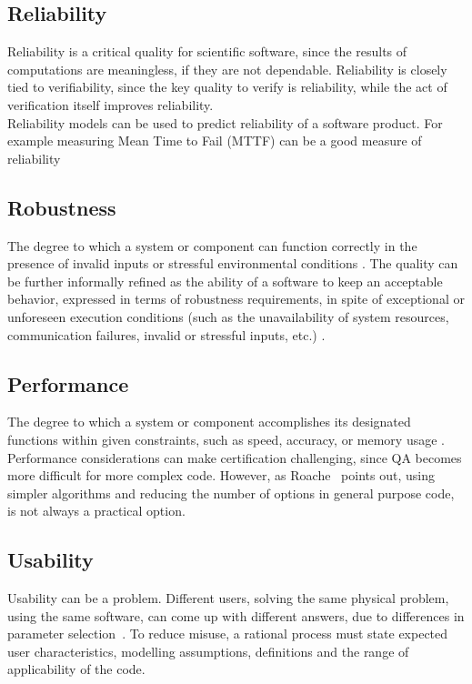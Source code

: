 \documentclass[12pt]{article}
\begin{document}
\subsection{Reliability}

Reliability is a critical quality for scientific software, since the results of
computations are meaningless, if they are not dependable.  Reliability is
closely tied to verifiability, since the key quality to verify is reliability,
while the act of verification itself improves reliability.\\
Reliability models can be used to predict reliability of a software product. For example measuring Mean Time to Fail (MTTF) can be a good measure of reliability \cite{berander2005software}

\subsection{Robustness}
The degree to which a system or component can function correctly in the presence of invalid inputs or stressful environmental conditions \cite{IEEEStdGlossarySET1990}.
The quality can be further informally refined as the ability of a software to keep an acceptable behavior, expressed in terms of robustness requirements, in spite of exceptional or unforeseen execution conditions (such as the unavailability of system resources, communication failures, invalid or stressful inputs, etc.) \cite{fernandez2005model}.

\subsection{Performance}

The degree to which a system or component accomplishes its designated functions within given constraints, such as speed, accuracy, or memory usage \cite{IEEEStdGlossarySET1990}.
Performance considerations can make certification challenging, since QA becomes more difficult for more complex code.  However, as Roache~\cite[p.~355]{Roache1998} points out, using simpler algorithms and reducing the number of options in general purpose code, is not always a practical option.

\subsection{Usability}

Usability can be a problem.  Different users, solving the same physical problem,
using the same software, can come up with different answers, due to differences
in parameter selection~\cite[p.~370]{Roache1998}.  To reduce misuse, a rational
process must state expected user characteristics, modelling assumptions,
definitions and the range of applicability of the code.
\end{document}
